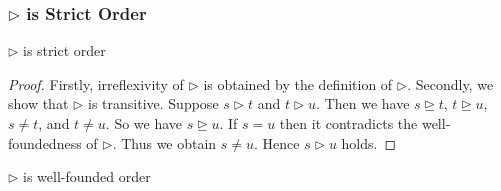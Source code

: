 \documentclass[12pt,aspectratio=169]{beamer}
\begin{document}
\begin{frame}
    \frametitle{$\rhd$ is Strict Order}
    \begin{lemma}
        $\rhd$ is strict order
    \end{lemma}
    \pause
    \begin{proof}
        Firstly, irreflexivity of $\rhd$ is obtained by the definition of $\rhd$.
        \pause
        Secondly, we show that $\rhd$ is transitive. Suppose $s \rhd t$ and $t \rhd u$.
        \pause
        Then we have $s \unrhd t$, $t \unrhd u$, $s \neq t$, and $t \neq u$.
        \pause
        So we have $s \unrhd u$. If $s = u$ then it contradicts the well-foundedness of $\rhd$.
        \pause
        Thus we obtain $s \neq u$. Hence $s \rhd u$ holds.
    \end{proof}
    \begin{corollary}
        $\rhd$ is well-founded order
    \end{corollary}
\end{frame}
\end{document}
